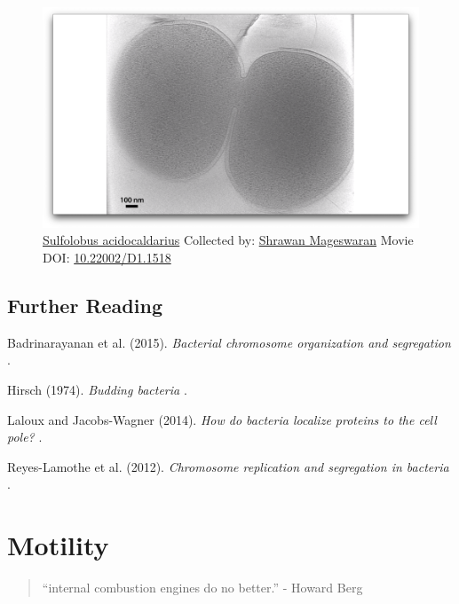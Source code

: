 \documentclass[]{tufte-book}
\begin{document}
\begin{figure}
\includegraphics{movie_stills/5_12} \caption[\protect\hyperlink{tree}{Sulfolobus acidocaldarius} Collected
by: \protect\hyperlink{shrawan_mageswaran}{Shrawan Mageswaran} Movie
DOI: \href{https://doi.org/10.22002/D1.1518}{10.22002/D1.1518}]{\protect\hyperlink{tree}{Sulfolobus acidocaldarius} Collected
by: \protect\hyperlink{shrawan_mageswaran}{Shrawan Mageswaran} Movie
DOI: \href{https://doi.org/10.22002/D1.1518}{10.22002/D1.1518}}\label{fig:5-12}
\end{figure}

\section{Further Reading}\label{further-reading}

Badrinarayanan et al. (2015). \emph{Bacterial chromosome organization
and segregation} \citep{badrinarayanan2015}.

Hirsch (1974). \emph{Budding bacteria} \citep{hirsch1974}.

Laloux and Jacobs-Wagner (2014). \emph{How do bacteria localize proteins
to the cell pole?} \citep{laloux2014}.

Reyes-Lamothe et al. (2012). \emph{Chromosome replication and
segregation in bacteria} \citep{reyes-lamothe2012}.

\chapter{Motility}\label{motility}

\begin{quote}
``internal combustion engines do no better.'' - Howard Berg
\citep{berg1988}
\end{quote}
\end{document}
